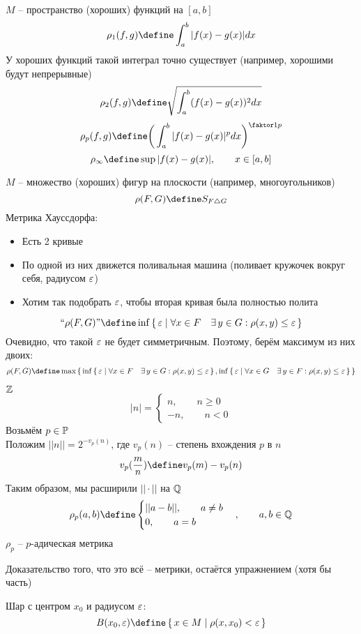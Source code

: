\begin{exmpls}
	\item $M$ -- пространство (хороших) функций на $[a, b]$
	$$ \rho_1(f, g) \define \int_a^b|f(x) - g(x)|dx $$
	У хороших функций такой интеграл точно существует (например, хорошими будут непрерывные)
	$$ \rho_2(f, g) \define \sqrt{ \int_a^b (f(x) - g(x))^2dx} $$
	$$ \rho_p(f, g) \define \bigg( \int_a^b |f(x) - g(x)|^pdx \bigg)^{\faktor1p} $$
	$$ \rho_\infty \define \sup |f(x) - g(x)|, \qquad x \in [a, b] $$
	\item $M$ -- множество (хороших) фигур на плоскости (например, многоугольников)
	$$ \rho(F, G) \define S_{F \triangle G} $$
	Метрика Хауссдорфа:
	\begin{itemize}
		\item Есть 2 кривые
		\item По одной из них движется поливальная машина (поливает кружочек вокруг себя, радиусом $\varepsilon$)
		\item Хотим так подобрать $\varepsilon$, чтобы вторая кривая была полностью полита
	\end{itemize}
	$$ ``\rho(F, G)" \define \inf\set{\veps | \forall x \in F \quad \exist y \in G : \rho(x, y) \le \veps} $$
	Очевидно, что такой $\varepsilon$ не будет симметричным. Поэтому, берём максимум из них двоих:
	$$ \rho(F, G) \define \max\set{ \inf\set{\veps | \forall x \in F \quad \exist y \in G : \rho(x, y) \le \veps}, \inf\set{\veps | \forall x \in G \quad \exist y \in F : \rho(x, y) \le \veps} } $$
	\item $\mathbb{Z}$
	$$ |n| =
	\begin{cases}
		n, \qquad n \ge 0 \\
		-n, \qquad n < 0
	\end{cases} $$
	Возьмём $p \in \mathbb{P}$ \\
	Положим $||n|| = 2^{-v_p(n)} $, где $v_p(n)$ -- степень вхождения $p$ в $n$
	$$ v_p(\frac{m}n) \define v_p(m) - v_p(n) $$
	Таким образом, мы расширили $||\cdot||$ на $\mathbb{Q}$ \\
	$$ \rho_p(a, b) \define
	\begin{cases}
		||a - b||, \qquad a \ne b \\
		0, \qquad a = b
	\end{cases}, \qquad a, b \in \Q $$
	$ \rho_p $ -- $p$-адическая метрика
\end{exmpls}

Доказательство того, что это всё -- метрики, остаётся упражнением (хотя бы часть)

\begin{definition}
	Шар с центром $x_0$ и радиусом $\varepsilon$:
	$$ B(x_0, \veps) \define \set{x \in M | \rho(x, x_0) < \veps} $$
\end{definition}

